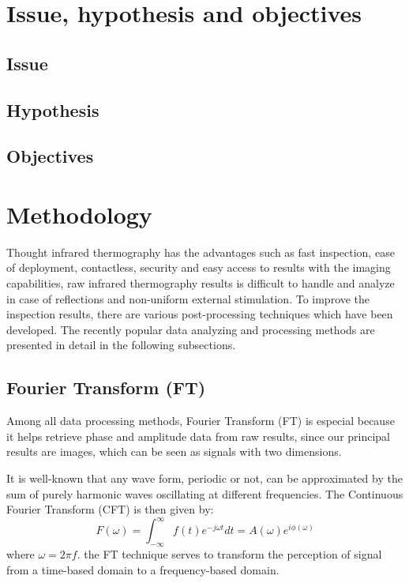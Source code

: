 \section{Issue, hypothesis and objectives}
\subsection{Issue}

\subsection{Hypothesis}

\subsection{Objectives}




\section{Methodology}
Thought infrared thermography has the advantages such as fast inspection, ease of deployment, contactless, security and easy access to results with the imaging capabilities, raw infrared thermography results is difficult to handle and analyze in case of reflections and non-uniform external stimulation. To improve the inspection results, there are various post-processing techniques which have been developed. The recently popular data analyzing and processing methods are presented in detail in the following subsections.
\subsection{Fourier Transform (FT)}
Among all data processing methods, Fourier Transform (FT) is especial because it helps retrieve phase and amplitude data from raw results, since our principal results are images, which can be seen as signals with two dimensions.

It is well-known that any wave form, periodic or not, can be approximated by the sum of purely harmonic waves oscillating at different frequencies. The Continuous Fourier Transform (CFT) is then given by:
\begin{equation}
F(\omega) = \int_{-\infty}^{\infty}f(t)e^{-j\omega t}dt = A(\omega)e^{i\phi(\omega)}
\end{equation}
where $\omega = 2 \pi f$. the FT technique serves to transform the perception of signal from a time-based domain to a frequency-based domain.

